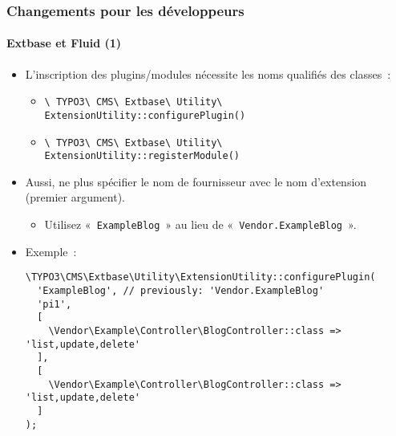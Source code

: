 
\begin{frame}[fragile]
	\frametitle{Changements pour les développeurs}
	\framesubtitle{Extbase et Fluid (1)}

	\lstset{basicstyle=\tiny\ttfamily}

	\begin{itemize}
		\item L'inscription des plugins/modules nécessite les noms qualifiés des classes~:

			\begin{itemize}\smaller
				\item \texttt{\textbackslash
					TYPO3\textbackslash
					CMS\textbackslash
					Extbase\textbackslash
					Utility\textbackslash
					ExtensionUtility::configurePlugin()}
				\item \texttt{\textbackslash
					TYPO3\textbackslash
					CMS\textbackslash
					Extbase\textbackslash
					Utility\textbackslash
					ExtensionUtility::registerModule()}
			\end{itemize}\normalsize

		\item Aussi, ne plus spécifier le nom de fournisseur avec le nom d'extension (premier argument).

			\begin{itemize}\smaller
				\item[\ding{228}] Utilisez «~\texttt{ExampleBlog}~» au lieu de «~\texttt{Vendor.ExampleBlog}~».
			\end{itemize}

		\item Exemple~:

\begin{lstlisting}
\TYPO3\CMS\Extbase\Utility\ExtensionUtility::configurePlugin(
  'ExampleBlog', // previously: 'Vendor.ExampleBlog'
  'pi1',
  [
    \Vendor\Example\Controller\BlogController::class => 'list,update,delete'
  ],
  [
    \Vendor\Example\Controller\BlogController::class => 'list,update,delete'
  ]
);
\end{lstlisting}

	\end{itemize}

\end{frame}


